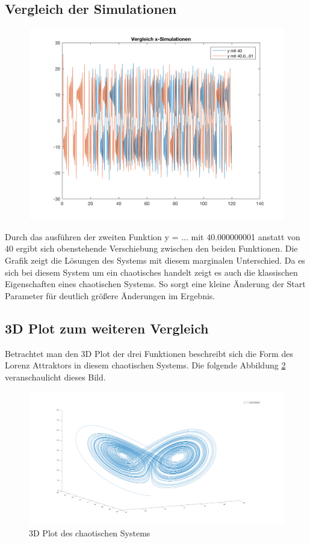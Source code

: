 \documentclass[]{scrartcl}
\begin{document}
\subsection{Vergleich der Simulationen} \label{subsec:vergleich}
\begin{figure}[H]
	\centering
	\includegraphics[width=1\linewidth]{a1_3_2}
	\caption{}
	\label{fig:a1_3_2}
\end{figure}

Durch das ausführen der zweiten Funktion y = ... mit 40.000000001 anstatt von 40 ergibt sich obenstehende Verschiebung zwischen den beiden Funktionen. Die Grafik zeigt die Lösungen des Systems mit diesem marginalen Unterschied. Da es sich bei diesem System um ein chaotisches handelt zeigt es auch die klassischen Eigenschaften eines chaotischen Systems. So sorgt eine kleine Änderung der Start Parameter für deutlich größere Änderungen im Ergebnis.

\subsection{3D Plot zum weiteren Vergleich}

Betrachtet man den 3D Plot der drei Funktionen beschreibt sich die Form des Lorenz Attraktors in diesem chaotischen Systems. Die folgende Abbildung \ref{fig:a1_3_3} veranschaulicht dieses Bild.

\begin{figure}[H]
	\centering
	\includegraphics[width=1\linewidth]{a1_3_3}
	\caption{3D Plot des chaotischen Systems}
	\label{fig:a1_3_3}
\end{figure}
\end{document}
